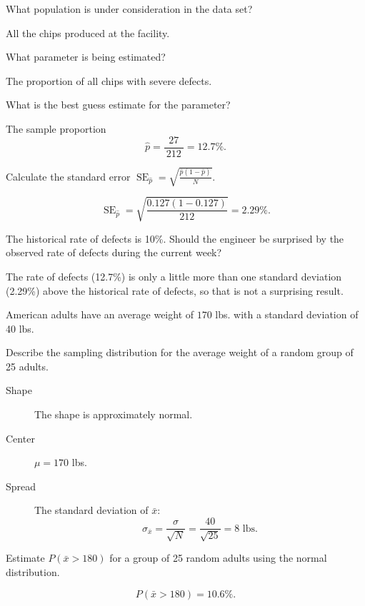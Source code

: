 \documentclass[12pt,answers]{exam}
\newcounter{countA}
\begin{document}
\begin{questions}
  \begin{parts}
  \item
    What population is under consideration in the data set?
\begin{solution}
All the chips produced at the facility.
\end{solution}
\vfill
  \item
    What parameter is being estimated?
\begin{solution}
The proportion of all chips with severe defects. 
\end{solution}
\vfill
  \item
    What is the best guess estimate for the parameter?
\begin{solution}
The sample proportion
$$\hat{p} = \frac{ 27 }{~ 212 ~} = 12.7\%.$$
\end{solution}
\vfill
  \item
    Calculate the standard error $\displaystyle \operatorname{SE}_{\hat{p}} = \sqrt{\frac{\hat{p}(1-\hat{p})}{N}}.$
\begin{solution}
$$\operatorname{SE}_{\hat{p}} = \sqrt{\frac{ 0.127 (1-0.127) }{ 212 }} = 2.29\%.$$
\end{solution}
\vfill
  \item
    The historical rate of defects is 10\%. Should the engineer be
    surprised by the observed rate of defects during the current week?
\begin{solution}
The rate of defects (12.7\%) is only a little more than one standard deviation (2.29\%) above the historical rate of defects, so that is not a surprising result. 
\end{solution}
\vfill
  \end{parts}
\item
  American adults have an average weight of \(170\) lbs. with a standard
  deviation of 40 lbs.

  \begin{parts}
  \item
    Describe the sampling distribution for the average weight of a
    random group of 25 adults.
\begin{solution}
\begin{description}
\item[Shape] The shape is approximately normal.
\item[Center] $\mu = 170$ lbs.
\item[Spread] The standard deviation of $\bar{x}$:
$$\sigma_{\bar{x}} = \frac{\sigma}{\sqrt{N}} = \frac{40}{\sqrt{25}} = 8 \text{ lbs}.$$
\end{description}
\end{solution}
\vfill
  \item
    Estimate \(P(\bar{x} > 180)\) for a group of 25 random adults using the normal distribution.
\begin{solution}
$$P(\bar{x} > 180) = 10.6\%.$$
\end{solution}
\vfill
  \end{parts}

\setcounter{countA}{\value{question}}
\end{questions}
\end{document}

